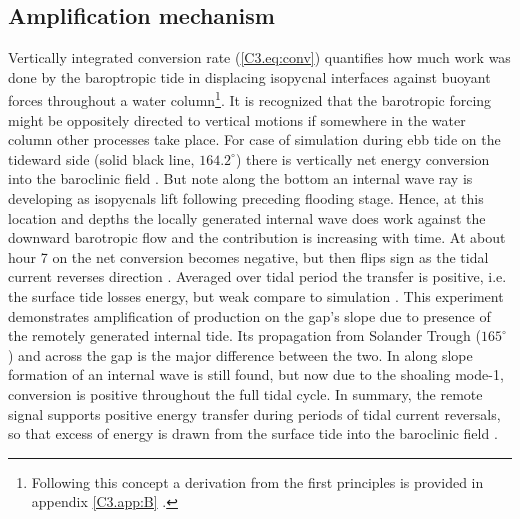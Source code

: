 \documentclass[12pt]{article}
\begin{document}
\subsection{Amplification mechanism}
Vertically integrated conversion rate (\ref{C3.eq:conv}) quantifies how much work was done by the 
baroptropic tide in displacing isopycnal interfaces against buoyant forces throughout a water 
column\footnote{Following this concept a derivation from the first principles is provided in 
appendix \ref{C3.app:B} \citep[see also]{kurapov2003m, kelly2010topo}.}. It is recognized 
that the barotropic forcing might be oppositely directed to vertical motions if somewhere in the 
water column other processes take place. For case of  simulation 
 during ebb tide on the tideward side (solid black line, 
$164.2^{\circ}$) there is vertically net energy conversion into the baroclinic field 
. But note along the bottom an internal wave ray is developing as 
isopycnals lift following preceding flooding stage. Hence, at this location and depths the locally 
generated internal wave does work against the downward barotropic flow and the contribution is 
increasing with time. At about hour 7 on  the net conversion becomes 
negative, but then flips sign as the tidal current reverses direction . 
Averaged over tidal period the transfer is positive, i.e. the surface tide losses energy, but weak 
compare to  simulation . This experiment demonstrates 
amplification of production on the gap's slope due to presence of the remotely generated internal 
tide. Its propagation from Solander Trough ($165^{\circ}$) and across the gap is the major 
difference between the two. In  along slope formation of an internal wave is still 
found, but now due to the shoaling mode-1, conversion is positive throughout the full tidal cycle. 
In summary, the remote signal supports positive energy transfer during periods of tidal current 
reversals, so that excess of energy is drawn from the surface tide into the baroclinic field 
.\\
\end{document}
